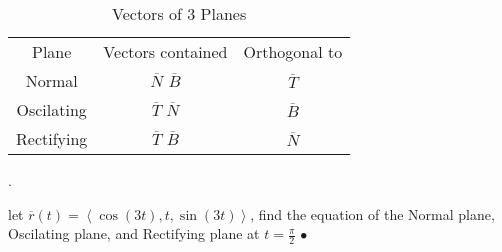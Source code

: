 \begin{table}[htpb]
	\centering
	\caption{Vectors of 3 Planes}
	\label{tab:label}
	\begin{tabular}{| c | c | c |}
		\cline{1-3}
		Plane  & Vectors contained & Orthogonal to\\
	\cline{1-3}
	Normal & $\overline{N}$ $\overline{B}$ & $\overline{T}$\\
	\cline{2-3}
	Oscilating & $\overline{T}$ $\overline{N}$ & $\overline{B}$ \\
	\cline{2-3}
	Rectifying & $\overline{T}$ $\overline{B}$ & $\overline{N}$ \\
	\cline{1-3}
	\end{tabular}
\end{table}


\begin{example}.

	let $\overline{r}(t) = \left<\cos(3t), t, \sin(3t) \right>$, find the equation of the Normal
	plane, Oscilating plane, and Rectifying plane at $t=\frac{\pi}{2}$
\smallskip\hfill$\bullet$\end{example}


